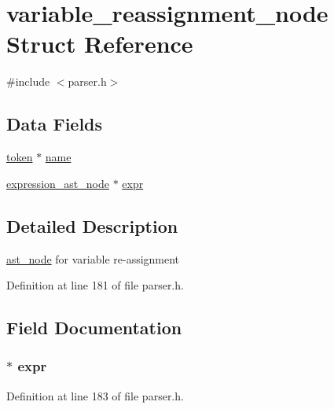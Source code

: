 \hypertarget{structvariable__reassignment__node}{\section{variable\+\_\+reassignment\+\_\+node Struct Reference}
\label{structvariable__reassignment__node}
}


{\ttfamily \#include $<$parser.\+h$>$}

\subsection*{Data Fields}
\begin{DoxyCompactItemize}
\item 
\hyperlink{structtoken}{token} $\ast$ \hyperlink{structvariable__reassignment__node_a0be25b04f38aae29e2dd7c1b72d4797c}{name}
\item 
\hyperlink{parser_8h_a24e739ff40763d29ca9d4dab5b30819f}{expression\+\_\+ast\+\_\+node} $\ast$ \hyperlink{structvariable__reassignment__node_af0ee16005d665771829bfa0e2ec96040}{expr}
\end{DoxyCompactItemize}


\subsection{Detailed Description}
\hyperlink{structast__node}{ast\+\_\+node} for variable re-\/assignment 

Definition at line 181 of file parser.\+h.



\subsection{Field Documentation}
\hypertarget{structvariable__reassignment__node_af0ee16005d665771829bfa0e2ec96040}{
\subsubsection[{expr}]{$\ast$ expr}}\label{structvariable__reassignment__node_af0ee16005d665771829bfa0e2ec96040}


Definition at line 183 of file parser.\+h.

